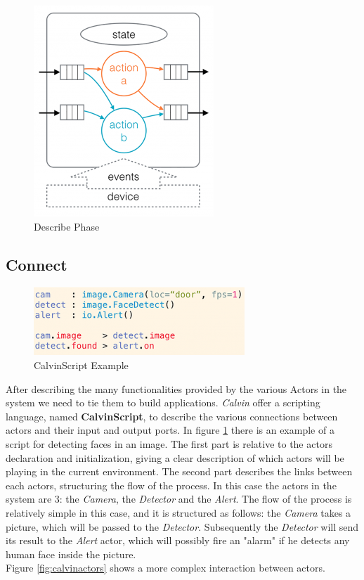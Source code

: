   \begin{figure}[h]
  \caption{Describe Phase}
  \centering
  \includegraphics[scale=0.75]{calvin1.png}
  \end{figure}


\subsection{Connect}

    \begin{figure}[h]
    \caption{CalvinScript Example}
    \label{fig:calvinscript}
    \centering
    \includegraphics[scale=0.75]{calvin2.png}
    \end{figure}

  After describing the many functionalities provided by the various Actors in the system
  we need to tie them to build applications. \textit{Calvin} offer a scripting language,
  named \textbf{CalvinScript}, to describe the various connections between actors
  and their input and output ports. In figure \ref{fig:calvinscript} there is an example
  of a script for detecting faces in an image. The first part is relative to the actors declaration
  and initialization, giving a clear description of which actors will be playing in the current
  environment. The second part describes the links between each actors, structuring the flow
  of the process. In this case the actors in the system are 3: the \textit{Camera}, the \textit{Detector}
  and the \textit{Alert}. The flow of the process is relatively simple in this case, and it is structured
  as follows: the  \textit{Camera} takes a picture, which will be passed to the \textit{Detector}. Subsequently
  the \textit{Detector} will send its result to the \textit{Alert} actor, which will possibly fire an "alarm" if he
  detects any human face inside the picture.\\
  Figure \ref{fig:calvinactors} shows a more complex interaction between actors. %

